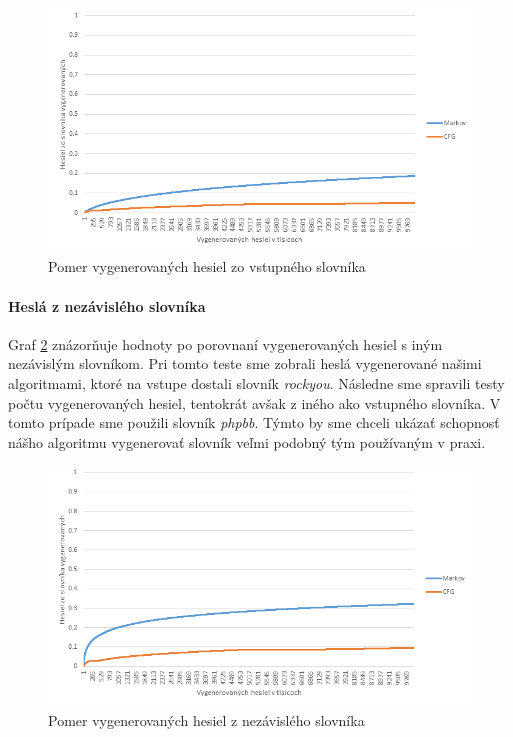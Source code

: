 \begin{figure}[ht]
    \centering
    \includegraphics[width=1\textwidth]{sameDictAcc}
    \caption{Pomer vygenerovaných hesiel zo vstupného slovníka}
    \label{fig:sameDictAcc}
\end{figure}

\paragraph{Heslá z nezávislého slovníka}
Graf \ref{fig:otherDictAcc} znázorňuje hodnoty po porovnaní vygenerovaných hesiel s iným nezávislým slovníkom. Pri tomto teste sme zobrali heslá vygenerované našimi algoritmami, ktoré na vstupe dostali slovník \emph{rockyou}. Následne sme spravili testy počtu vygenerovaných hesiel, tentokrát avšak z iného ako vstupného slovníka. V tomto prípade sme použili slovník \emph{phpbb}. Týmto by sme chceli ukázať schopnosť nášho algoritmu vygenerovať slovník veľmi podobný tým používaným v praxi.

\begin{figure}[ht]
    \centering
    \includegraphics[width=1\textwidth]{otherDictAcc}
    \caption{Pomer vygenerovaných hesiel z nezávislého slovníka}
    \label{fig:otherDictAcc}
\end{figure}

